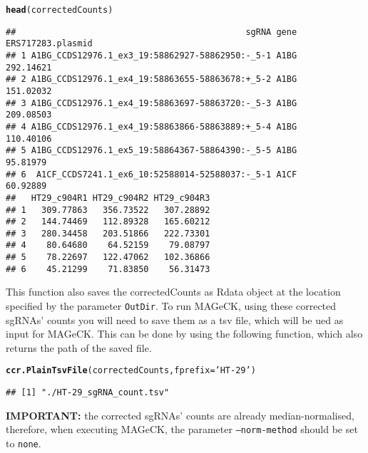 \documentclass{article}\usepackage[]{graphicx}\usepackage[]{color}
\makeatletter
\newcommand{\hlstr}[1]{\textcolor[rgb]{0.192,0.494,0.8}{#1}}%
\newcommand{\hlstd}[1]{\textcolor[rgb]{0.345,0.345,0.345}{#1}}%
\newcommand{\hlkwc}[1]{\textcolor[rgb]{0.333,0.667,0.333}{#1}}%
\newcommand{\hlkwd}[1]{\textcolor[rgb]{0.737,0.353,0.396}{\textbf{#1}}}%
\newenvironment{kframe}{%
 \def\at@end@of@kframe{}%
 \ifinner\ifhmode%
  \def\at@end@of@kframe{\end{minipage}}%
  \begin{minipage}{\columnwidth}%
 \fi\fi%
 \def\FrameCommand##1{\hskip\@totalleftmargin \hskip-\fboxsep
 \colorbox{shadecolor}{##1}\hskip-\fboxsep
     \hskip-\linewidth \hskip-\@totalleftmargin \hskip\columnwidth}%
 \MakeFramed {\advance\hsize-\width
   \@totalleftmargin\z@ \linewidth\hsize
   \@setminipage}}%
 {\par\unskip\endMakeFramed%
 \at@end@of@kframe}
\newenvironment{knitrout}{}{} %
\makeatother
\begin{document}
\begin{knitrout}
\color{fgcolor}\begin{kframe}
\begin{alltt}
\hlkwd{head}\hlstd{(correctedCounts)}
\end{alltt}
\begin{verbatim}
##                                             sgRNA gene ERS717283.plasmid
## 1 A1BG_CCDS12976.1_ex3_19:58862927-58862950:-_5-1 A1BG         292.14621
## 2 A1BG_CCDS12976.1_ex4_19:58863655-58863678:+_5-2 A1BG         151.02032
## 3 A1BG_CCDS12976.1_ex4_19:58863697-58863720:-_5-3 A1BG         209.08503
## 4 A1BG_CCDS12976.1_ex4_19:58863866-58863889:+_5-4 A1BG         110.40106
## 5 A1BG_CCDS12976.1_ex5_19:58864367-58864390:-_5-5 A1BG          95.81979
## 6  A1CF_CCDS7241.1_ex6_10:52588014-52588037:-_5-1 A1CF          60.92889
##   HT29_c904R1 HT29_c904R2 HT29_c904R3
## 1   309.77863   356.73522   307.28892
## 2   144.74469   112.89328   165.60212
## 3   280.34458   203.51866   222.73301
## 4    80.64680    64.52159    79.08797
## 5    78.22697   122.47062   102.36866
## 6    45.21299    71.83850    56.31473
\end{verbatim}
\end{kframe}
\end{knitrout}

This function also saves the correctedCounts as Rdata object at the location specified by the parameter \texttt{OutDir}.
To run MAGeCK, using these corrected sgRNAs' counts you will need to save them as a tsv file, which will be ued as input for MAGeCK. This can be done by using the following function, which also returns the path of the saved file.

\begin{knitrout}
\color{fgcolor}\begin{kframe}
\begin{alltt}
\hlkwd{ccr.PlainTsvFile}\hlstd{(correctedCounts,}\hlkwc{fprefix} \hlstd{=} \hlstr{'HT-29'}\hlstd{)}
\end{alltt}
\begin{verbatim}
## [1] "./HT-29_sgRNA_count.tsv"
\end{verbatim}
\end{kframe}
\end{knitrout}


\textbf{IMPORTANT:} the corrected sgRNAs' counts are already median-normalised,
therefore, when executing MAGeCK, the parameter \texttt{--norm-method} should be set to \texttt{none}.
\end{document}
